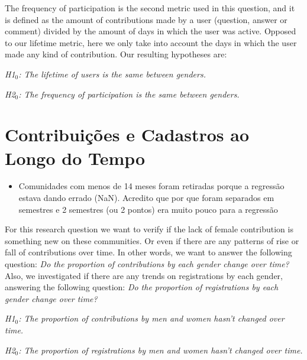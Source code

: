 The frequency of participation is the second metric used in this question, and it is defined as the amount of contributions made by a user (question, answer or comment) divided by the amount of days in which the user was active. Opposed to our lifetime metric, here we only take into account the days in which the user made any kind of contribution. Our resulting hypotheses are:

\textit{H1$_0$: The lifetime of users is the same between genders.}

\textit{H2$_0$: The frequency of participation is the same between genders.}


\section{Contribuições e Cadastros ao Longo do Tempo} %
\label{sub:contribui_es_e_cadastros_ao_longo_do_tempo}

\begin{itemize}
	\item Comunidades com menos de 14 meses foram retiradas porque a regressão estava dando errado (NaN). Acredito que por que foram separados em semestres e 2 semestres (ou 2 pontos) era muito pouco para a regressão
\end{itemize}

For this research question we want to verify if the lack of female contribution is something new on these communities. Or even if there are any patterns of rise or fall of contributions over time. In other words, we want to answer the following question: \textit{Do the proportion of contributions by each gender change over time?} Also, we investigated if there are any trends on registrations by each gender, answering the following question: \textit{Do the proportion of registrations by each gender change over time?}

\textit{H1$_0$: The proportion of contributions by men and women hasn't changed over time.}

\textit{H2$_0$: The proportion of registrations by men and women hasn't changed over time.}

